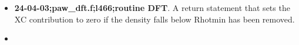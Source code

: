 \begin{itemize}
\item\textbf{24-04-03;paw_dft.f;l466;routine DFT}. A return statement
that sets the XC contribution to zero if the density falls below
Rhotmin has been removed. 
\item
\end{itemize}

